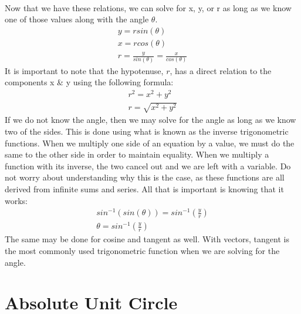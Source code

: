 \documentclass[12pt, letterpaper]{report}
\begin{document}
		\paragraph{} Now that we have these relations, we can solve for x, y, or r as long as we know one of those values along with the angle $\theta$. 
		\begin{align*}
		y = rsin\left(\theta\right)\\
		x = rcos\left(\theta\right)\\
		r = \frac{y}{sin\left(\theta\right)} = \frac{x}{cos\left(\theta\right)}
		\end{align*}
It is important to note that the hypotenuse, $r$, has a direct relation to the components x \& y using the following formula:
		\begin{align*}
		r^2 = x^2 + y^2\\
		r = \sqrt{x^2 + y^2}
		\end{align*}
If we do not know the angle, then we may solve for the angle as long as we know two of the sides. This is done using what is known as the inverse trigonometric functions. When we multiply one side of an equation by a value, we must do the same to the other side in order to maintain equality. When we multiply a function with its inverse, the two cancel out and we are left with a variable. Do not worry about understanding why this is the case, as these functions are all derived from infinite sums and series. All that is important is knowing that it works:
		\begin{align*}
		sin^{-1}\left(sin\left(\theta\right)\right) = sin^{-1}\left(\frac{y}{r}\right)
\\	
		\theta = sin^{-1}\left(\frac{y}{r}\right)
		\end{align*}
	The same may be done for cosine and tangent as well. With vectors, tangent is the most commonly used trigonometric function when we are solving for the angle.
	\section{Absolute Unit Circle}
\end{document}

